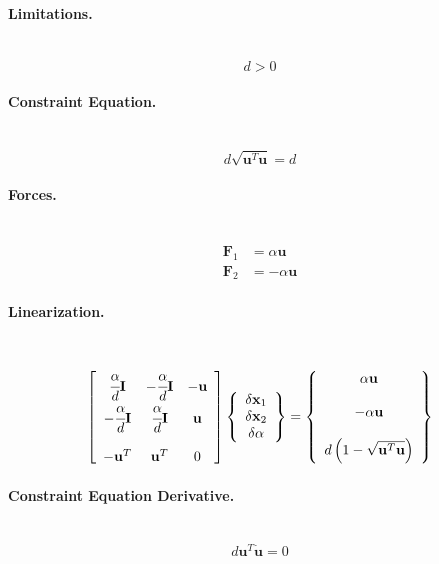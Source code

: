 \documentclass[10pt,dvips,fleqn,subeqn]{report}
\newcommand{\T}[1]{\bm{\mathbf{#1}}}
\begin{document}
\paragraph{Limitations.} \
\begin{equation}
	d > 0
\end{equation}

\paragraph{Constraint Equation.} \
\begin{equation}
	d \sqrt{\T{u}^T \T{u}} = d
\end{equation}

\paragraph{Forces.} \
\begin{subequations}
\begin{align}
	\T{F}_1 &= \alpha \T{u} \\
	\T{F}_2 &= -\alpha \T{u}
\end{align}
\end{subequations}

\paragraph{Linearization.} \
\begin{equation}
	\sqbr{\matr{ccc}{
		\cfrac{\alpha}{d}\T{I} & -\cfrac{\alpha}{d}\T{I} & -\T{u} \\
		-\cfrac{\alpha}{d}\T{I} & \cfrac{\alpha}{d}\T{I} & \T{u} \\
		\\
		-\T{u}^T & \T{u}^T & 0
	}}\cubr{\cvvect{
		\delta\T{x}_1 \\
		\delta\T{x}_2 \\
		\delta\alpha
	}} = \cubr{\cvvect{
		\alpha \T{u} \\
		\\
		- \alpha \T{u} \\
		\\
		d\plbr{1 - \sqrt{\T{u}^T \T{u}}}
	}}
\end{equation}

\paragraph{Constraint Equation Derivative.} \
\begin{equation}
	d \T{u}^T \dot{\T{u}} = 0
\end{equation}
\end{document}

